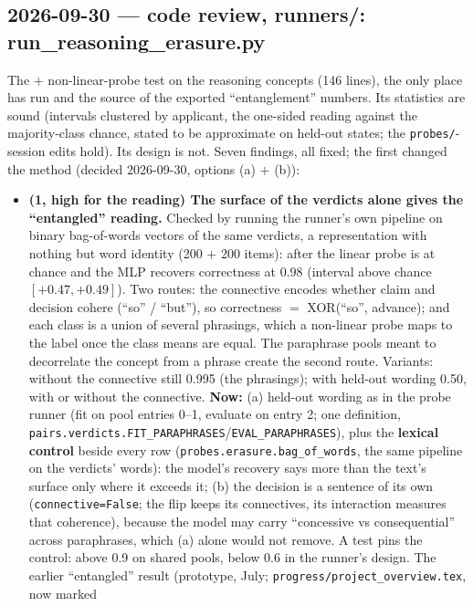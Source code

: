 \documentclass{article}
\begin{document}
\subsection*{2026-09-30 --- code review, runners/: run\_reasoning\_erasure.py}
The \leace{} $+$ non-linear-probe test on the reasoning concepts (146 lines), the only place \leace{} has run and the
source of the exported ``entanglement'' numbers. Its statistics are sound (intervals clustered by applicant, the
one-sided reading against the majority-class chance, \leace{} stated to be approximate on held-out states; the
\texttt{probes/}-session edits hold). Its design is not. Seven findings, all fixed; the first changed the method
(decided 2026-09-30, options (a) $+$ (b)):
\begin{itemize}
  \item \textbf{(1, high for the reading) The surface of the verdicts alone gives the ``entangled'' reading.} Checked
        by running the runner's own pipeline on binary bag-of-words vectors of the same verdicts, a representation
        with nothing but word identity (200 $+$ 200 items): after \leace{} the linear probe is at chance and the MLP
        recovers correctness at 0.98 (interval above chance $[+0.47, +0.49]$). Two routes: the connective encodes
        whether claim and decision cohere (``so'' / ``but''), so correctness $=$ XOR(``so'', advance); and each class
        is a union of several phrasings, which a non-linear probe maps to the label once the class means are equal.
        The paraphrase pools meant to decorrelate the concept from a phrase create the second route. Variants: without
        the connective still 0.995 (the phrasings); with held-out wording 0.50, with or without the connective.
        \textbf{Now:} (a) held-out wording as in the probe runner (fit on pool entries 0--1, evaluate on entry 2; one
        definition, \texttt{pairs.verdicts.FIT\_PARAPHRASES}/\texttt{EVAL\_PARAPHRASES}), plus the \textbf{lexical
        control} beside every row (\texttt{probes.erasure.bag\_of\_words}, the same pipeline on the verdicts' words):
        the model's recovery says more than the text's surface only where it exceeds it; (b) the decision is a
        sentence of its own (\texttt{connective=False}; the flip keeps its connectives, its interaction measures that
        coherence), because the model may carry ``concessive vs consequential'' across paraphrases, which (a) alone
        would not remove. A test pins the control: above 0.9 on shared pools, below 0.6 in the runner's design.
        The earlier ``entangled'' result (prototype, July; \texttt{progress/project\_overview.tex}, now marked

\end{itemize}
\end{document}
